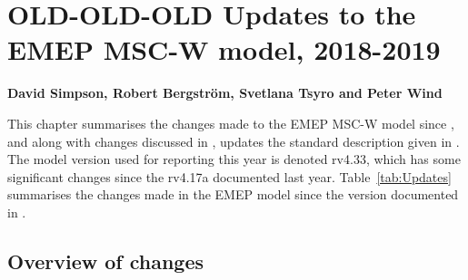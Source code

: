 \chapter[Model updates]{OLD-OLD-OLD Updates to the EMEP MSC-W model, 2018-2019}
\label{ch:ModelUpdates}


{\bf{David Simpson, Robert Bergstr\"om, Svetlana Tsyro and Peter Wind}}
\vspace{30pt}

This chapter summarises the changes made to the EMEP MSC-W  model
since \citet{R2018:ModDev}, and along with changes discussed in
\citet{R2013:ModDev,R2014:ModDev,R2015:ModDev,R2016:ModDev,R2017:ModDev}, updates
the standard description given in \citet{Simpson_et_al:EMEP}. The
model version used for reporting this year is denoted
rv4.33, which has some significant changes since the
rv4.17a documented last year.
Table~\ref{tab:Updates} summarises the changes made in the EMEP
model since the version documented in \citet{Simpson_et_al:EMEP}.

%

\section{Overview of changes} 

